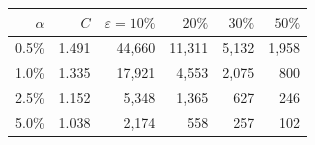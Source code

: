 \begin{tabular}{rrrrrr}
\toprule
$\alpha$ & $C$ & $\varepsilon=10\%$ & $20\%$ & $30\%$ & $50\%$ \\
\midrule
  0.5\% & 1.491 & 44{,}660 & 11{,}311 & 5{,}132 & 1{,}958 \\
  1.0\% & 1.335 & 17{,}921 & 4{,}553 & 2{,}075 & 800 \\
  2.5\% & 1.152 & 5{,}348 & 1{,}365 & 627 & 246 \\
  5.0\% & 1.038 & 2{,}174 & 558 & 257 & 102 \\
\bottomrule
\end{tabular}
